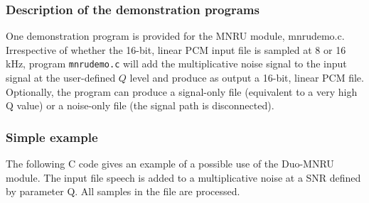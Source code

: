 \subsubsection {Description of the demonstration programs}

One demonstration program is provided for the MNRU module, mnrudemo.c.
Irrespective of whether the 16-bit, linear PCM input file is sampled
at 8 or 16 kHz, program {\tt mnrudemo.c} will add the multiplicative
noise signal to the input signal at the user-defined $Q$ level and
produce as output a 16-bit, linear PCM file. Optionally, the program
can produce a signal-only file (equivalent to a very high Q value) or
a noise-only file (the signal path is disconnected).


\subsubsection {Simple example}

The following C code gives an example of a possible use of the Duo-MNRU module.
The input file speech is added to a multiplicative noise at a SNR defined by
parameter Q. All samples in the file are processed.

